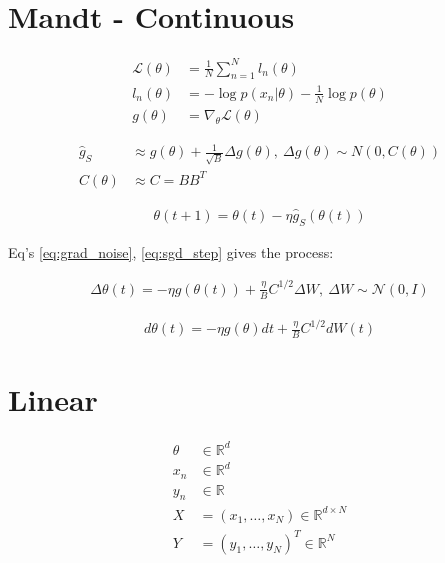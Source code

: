 \newcommand\batchSize{B}
\newcommand\sqrtC{C^{1/2}}
\newcommand\loss{\mathcal{L}}
\newcommand\lr{\eta}


\section{Mandt - Continuous}

\begin{align}
  \loss(\theta) &= \frac{1}{N} \sum_{n=1}^N l_n(\theta) \nonumber \\
  l_n(\theta) &= - \log p(x_n | \theta) - \frac{1}{N} \log p(\theta) \nonumber \\
  g(\theta) &= \nabla_{\theta} \loss(\theta)
  \label{eq:loss}
\end{align}

\begin{align}
  \hat{g}_S &\approx g(\theta) + \frac{1}{\sqrt{\batchSize}} \Delta g(\theta),\ \Delta g(\theta) \sim N(0, C(\theta)) \nonumber \\
  C(\theta) &\approx C = B B^T
  \label{eq:grad_noise}
\end{align}

\begin{align}
  \theta(t + 1) = \theta(t) - \lr \hat{g}_S( \theta(t) )
  \label{eq:sgd_step}
\end{align}

Eq's \eqref{eq:grad_noise}, \eqref{eq:sgd_step} gives the process:

\begin{align}
  \Delta \theta(t) = - \lr g( \theta(t) ) + \frac{\lr}{\batchSize} \sqrtC \Delta W,\ \Delta W \sim \mathcal{N}(0, I)
  \label{eq:sgd_step}
\end{align}

\begin{align}
  d \theta(t) = - \lr g( \theta )dt + \frac{\lr}{\batchSize} \sqrtC  dW(t)
  \label{eq:continuous:sgd_step}
\end{align}

\section{Linear}

\begin{align}
  \theta &\in \mathbb{R}^d \nonumber \\
  x_n &\in \mathbb{R}^d \nonumber \\
  y_n &\in \mathbb{R} \nonumber \\
  X &= (x_1, \dots, x_N)\in \mathbb{R}^{d \times N} \nonumber \\
  Y &= (y_1, \dots, y_N)^T \in \mathbb{R}^{N} \nonumber \\
\end{align}

